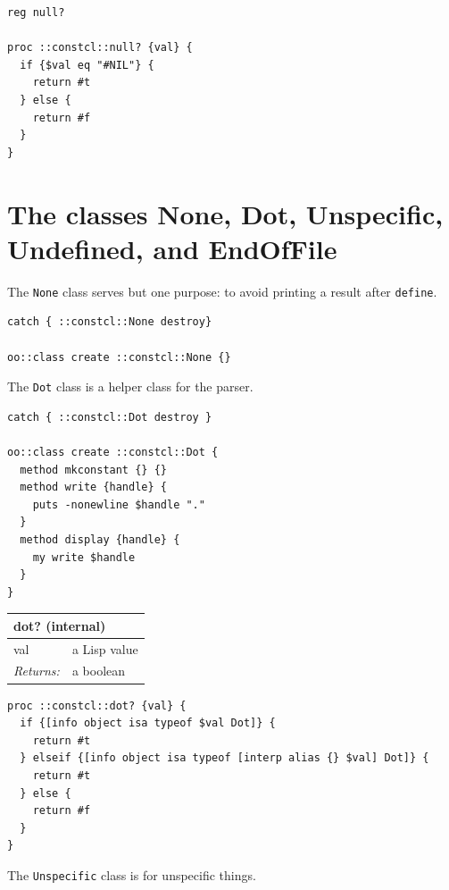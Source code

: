 \documentclass[twoside,9pt]{report}
\begin{document}
\noindent\makebox[\linewidth]{\rule{\linewidth}{0.4pt}}
\begin{lstlisting}
reg null?
 
proc ::constcl::null? {val} {
  if {$val eq "#NIL"} {
    return #t
  } else {
    return #f
  }
}
\end{lstlisting}
\noindent\makebox[\linewidth]{\rule{\linewidth}{0.4pt}}
\section{The classes None, Dot, Unspecific, Undefined, and EndOfFile}
\label{the-classes-none,-dot,-unspecific,-undefined,-and-endoffile}

The \texttt{None} class serves but one purpose: to avoid printing a result after \texttt{define}.

\noindent\makebox[\linewidth]{\rule{\linewidth}{0.4pt}}
\begin{lstlisting}
catch { ::constcl::None destroy}
 
oo::class create ::constcl::None {}
\end{lstlisting}
\noindent\makebox[\linewidth]{\rule{\linewidth}{0.4pt}}

The \texttt{Dot} class is a helper class for the parser.

\noindent\makebox[\linewidth]{\rule{\linewidth}{0.4pt}}
\begin{lstlisting}
catch { ::constcl::Dot destroy }
 
oo::class create ::constcl::Dot {
  method mkconstant {} {}
  method write {handle} {
    puts -nonewline $handle "."
  }
  method display {handle} {
    my write $handle
  }
}
\end{lstlisting}
\noindent\makebox[\linewidth]{\rule{\linewidth}{0.4pt}}
\begin{tabular}{ |l l| }
\hline
\multicolumn{2}{|l|}{dot? (internal)} \\
\hline
val & a Lisp value \\
\textit{Returns:} & a boolean \\
\hline
\end{tabular}

\noindent\makebox[\linewidth]{\rule{\linewidth}{0.4pt}}
\begin{lstlisting}
proc ::constcl::dot? {val} {
  if {[info object isa typeof $val Dot]} {
    return #t
  } elseif {[info object isa typeof [interp alias {} $val] Dot]} {
    return #t
  } else {
    return #f
  }
}
\end{lstlisting}
\noindent\makebox[\linewidth]{\rule{\linewidth}{0.4pt}}

The \texttt{Unspecific} class is for unspecific things.
\end{document}

